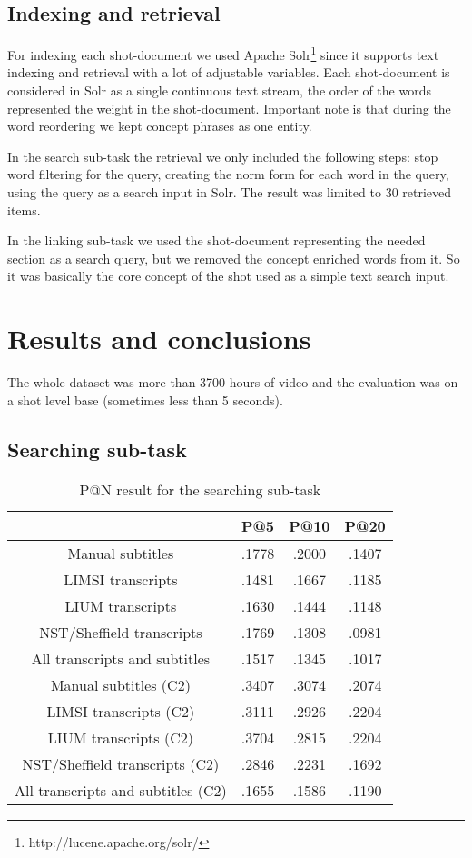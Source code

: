 \documentclass{acm_proc_article-me}
\begin{document}
\subsection{Indexing and retrieval}

For indexing each shot-document we used Apache Solr\footnote{http://lucene.apache.org/solr/} since it supports text indexing and retrieval with a lot of adjustable variables. Each shot-document is considered in Solr as a single continuous text stream, the order of the words represented the weight in the shot-document. Important note is that during the word reordering we kept concept phrases as one entity.

In the search sub-task the retrieval we only included the following steps: stop word filtering for the query, creating the norm form for each word in the query, using the query as a search input in Solr. The result was limited to 30 retrieved items.

In the linking sub-task we used the shot-document representing the needed section as a search query, but we removed the concept enriched words from it. So it was basically the core concept of the shot used as a simple text search input.

\section{Results and conclusions}

The whole dataset was more than 3700 hours of video and the evaluation was on a shot level base (sometimes less than 5 seconds).

\subsection{Searching sub-task}

\begin{table}[h]
\begin{tabular}{|c|c|c|c|}
	\hline 
	& P@5 & P@10 & P@20\tabularnewline
	\hline 
	\hline 
	Manual subtitles & .1778 & .2000 & .1407\tabularnewline
	\hline 
	LIMSI transcripts & .1481 & .1667 & .1185\tabularnewline
	\hline 
	LIUM transcripts & .1630 & .1444 & .1148\tabularnewline
	\hline 
	NST/Sheffield transcripts& .1769 & .1308 & .0981\tabularnewline
	\hline 
	All transcripts and subtitles & .1517 & .1345 & .1017\tabularnewline
	\hline 
	Manual subtitles (C2) & .3407 & .3074 & .2074\tabularnewline
	\hline 
	LIMSI transcripts (C2) & .3111 & .2926 & .2204\tabularnewline
	\hline 
	LIUM transcripts (C2) & .3704 & .2815 & .2204\tabularnewline
	\hline 
	NST/Sheffield transcripts (C2) & .2846 & .2231 & .1692\tabularnewline	
	\hline 
	All transcripts and subtitles (C2) & .1655 & .1586 & .1190\tabularnewline	
	\hline 
\end{tabular}
\caption{P@N result for the searching sub-task}
\end{table}
\end{document}
